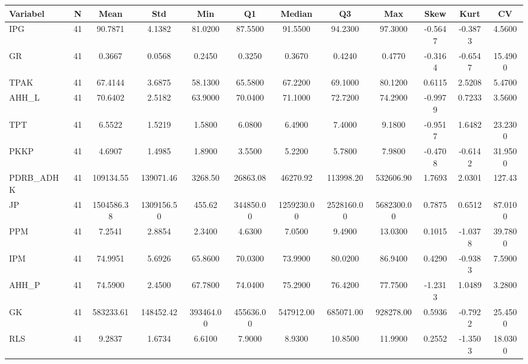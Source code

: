 \begin{adjustbox}{max width=\textwidth}
\small
\begin{tabular}{|p{2.5cm}|c|c|c|c|c|c|c|c|c|c|c|}
\hline
\textbf{Variabel} & \textbf{N} & \textbf{Mean} & \textbf{Std} & \textbf{Min} & \textbf{Q1} & \textbf{Median} & \textbf{Q3} & \textbf{Max} & \textbf{Skew} & \textbf{Kurt} & \textbf{CV} \\
\hline
IPG & 41 & 90.7871 & 4.1382 & 81.0200 & 87.5500 & 91.5500 & 94.2300 & 97.3000 & -0.5647 & -0.3873 & 4.5600 \\
GR & 41 & 0.3667 & 0.0568 & 0.2450 & 0.3250 & 0.3670 & 0.4240 & 0.4770 & -0.3164 & -0.6547 & 15.4900 \\
TPAK & 41 & 67.4144 & 3.6875 & 58.1300 & 65.5800 & 67.2200 & 69.1000 & 80.1200 & 0.6115 & 2.5208 & 5.4700 \\
AHH\_L & 41 & 70.6402 & 2.5182 & 63.9000 & 70.0400 & 71.1000 & 72.7200 & 74.2900 & -0.9979 & 0.7233 & 3.5600 \\
TPT & 41 & 6.5522 & 1.5219 & 1.5800 & 6.0800 & 6.4900 & 7.4000 & 9.1800 & -0.9517 & 1.6482 & 23.2300 \\
PKKP & 41 & 4.6907 & 1.4985 & 1.8900 & 3.5500 & 5.2200 & 5.7800 & 7.9800 & -0.4708 & -0.6142 & 31.9500 \\
PDRB\_ADHK & 41 & 109134.55 & 139071.46 & 3268.50 & 26863.08 & 46270.92 & 113998.20 & 532606.90 & 1.7693 & 2.0301 & 127.43 \\
JP & 41 & 1504586.38 & 1309156.50 & 455.62 & 344850.00 & 1259230.00 & 2528160.00 & 5682300.00 & 0.7875 & 0.6512 & 87.0100 \\
PPM & 41 & 7.2541 & 2.8854 & 2.3400 & 4.6300 & 7.0500 & 9.4900 & 13.0300 & 0.1015 & -1.0378 & 39.7800 \\
IPM & 41 & 74.9951 & 5.6926 & 65.8600 & 70.0300 & 73.9900 & 80.0200 & 86.9400 & 0.4290 & -0.9383 & 7.5900 \\
AHH\_P & 41 & 74.5900 & 2.4500 & 67.7800 & 74.0400 & 75.2900 & 76.4200 & 77.7500 & -1.2313 & 1.0489 & 3.2800 \\
GK & 41 & 583233.61 & 148452.42 & 393464.00 & 455636.00 & 547912.00 & 685071.00 & 928278.00 & 0.5936 & -0.7922 & 25.4500 \\
RLS & 41 & 9.2837 & 1.6734 & 6.6100 & 7.9000 & 8.9300 & 10.8500 & 11.9900 & 0.2552 & -1.3503 & 18.0300 \\
\hline
\end{tabular}
\end{adjustbox}
